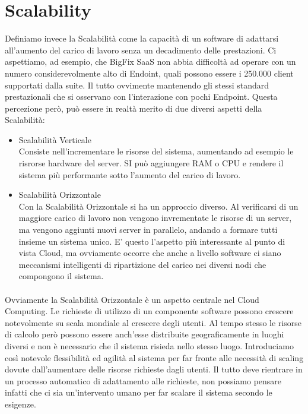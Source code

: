 \section{Scalability}
Definiamo invece la Scalabilità come la capacità di un software di adattarsi all'aumento del carico di lavoro senza un decadimento delle prestazioni. Ci aspettiamo, ad esempio, che BigFix SaaS non abbia difficoltà ad operare con un numero considerevolmente alto di Endoint, quali possono essere i 250.000 client supportati dalla suite. Il tutto ovvimente mantenendo gli stessi standard prestazionali che si osservano con l'interazione con pochi Endpoint. Questa percezione però, può essere in realtà merito di due diversi aspetti della Scalabilità:
\begin{itemize}
	\item  Scalabilità Verticale \\
	Consiste nell'incrementare le risorse del sistema, aumentando ad esempio le risrorse hardware del server. SI può aggiungere RAM o CPU e rendere il sistema più performante sotto l'aumento del carico di lavoro.
	
	\item  Scalabilità Orizzontale \\
	Con la Scalabilità Orizzontale si ha un approccio diverso. Al verificarsi di un maggiore carico di lavoro non vengono invrementate le risorse di un server, ma vengono aggiunti nuovi server in parallelo, andando a formare tutti insieme un sistema unico. E' questo l'aspetto più interessante al punto di vista Cloud, ma ovviamente occorre che anche a livello software ci siano meccanismi intelligenti di ripartizione del carico nei diversi nodi che  compongono il sistema.
\end{itemize}

\paragraph{}
Ovviamente la Scalabilità Orizzontale è un aspetto centrale nel Cloud Computing. Le richieste di utilizzo di un componente software possono crescere notevolmente su scala mondiale al crescere degli utenti. Al tempo stesso le risorse di calcolo però possono essere anch'esse distribuite geograficamente in luoghi diversi e non è necessario che il sistema risieda nello stesso luogo. Introduciamo così notevole flessibilità ed agilità al sistema per far fronte alle necessità di scaling dovute dall'aumentare delle risorse richieste dagli utenti. Il tutto deve rientrare in un processo automatico di adattamento alle richieste, non possiamo pensare infatti che ci sia un'intervento umano per far scalare il sistema secondo le esigenze.

